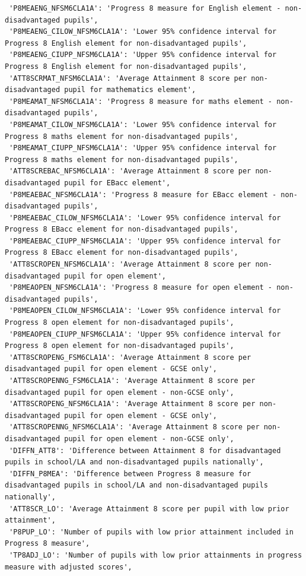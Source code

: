 \documentclass[
  letterpaper,
  DIV=11,
  numbers=noendperiod]{scrartcl}
\begin{document}
\begin{verbatim}
 'P8MEAENG_NFSM6CLA1A': 'Progress 8 measure for English element - non-disadvantaged pupils',
 'P8MEAENG_CILOW_NFSM6CLA1A': 'Lower 95% confidence interval for Progress 8 English element for non-disadvantaged pupils',
 'P8MEAENG_CIUPP_NFSM6CLA1A': 'Upper 95% confidence interval for Progress 8 English element for non-disadvantaged pupils',
 'ATT8SCRMAT_NFSM6CLA1A': 'Average Attainment 8 score per non-disadvantaged pupil for mathematics element',
 'P8MEAMAT_NFSM6CLA1A': 'Progress 8 measure for maths element - non-disadvantaged pupils',
 'P8MEAMAT_CILOW_NFSM6CLA1A': 'Lower 95% confidence interval for Progress 8 maths element for non-disadvantaged pupils',
 'P8MEAMAT_CIUPP_NFSM6CLA1A': 'Upper 95% confidence interval for Progress 8 maths element for non-disadvantaged pupils',
 'ATT8SCREBAC_NFSM6CLA1A': 'Average Attainment 8 score per non-disadvantaged pupil for EBacc element',
 'P8MEAEBAC_NFSM6CLA1A': 'Progress 8 measure for EBacc element - non-disadvantaged pupils',
 'P8MEAEBAC_CILOW_NFSM6CLA1A': 'Lower 95% confidence interval for Progress 8 EBacc element for non-disadvantaged pupils',
 'P8MEAEBAC_CIUPP_NFSM6CLA1A': 'Upper 95% confidence interval for Progress 8 EBacc element for non-disadvantaged pupils',
 'ATT8SCROPEN_NFSM6CLA1A': 'Average Attainment 8 score per non-disadvantaged pupil for open element',
 'P8MEAOPEN_NFSM6CLA1A': 'Progress 8 measure for open element - non-disadvantaged pupils',
 'P8MEAOPEN_CILOW_NFSM6CLA1A': 'Lower 95% confidence interval for Progress 8 open element for non-disadvantaged pupils',
 'P8MEAOPEN_CIUPP_NFSM6CLA1A': 'Upper 95% confidence interval for Progress 8 open element for non-disadvantaged pupils',
 'ATT8SCROPENG_FSM6CLA1A': 'Average Attainment 8 score per disadvantaged pupil for open element - GCSE only',
 'ATT8SCROPENNG_FSM6CLA1A': 'Average Attainment 8 score per disadvantaged pupil for open element - non-GCSE only',
 'ATT8SCROPENG_NFSM6CLA1A': 'Average Attainment 8 score per non-disadvantaged pupil for open element - GCSE only',
 'ATT8SCROPENNG_NFSM6CLA1A': 'Average Attainment 8 score per non-disadvantaged pupil for open element - non-GCSE only',
 'DIFFN_ATT8': 'Difference between Attainment 8 for disadvantaged pupils in school/LA and non-disadvantaged pupils nationally',
 'DIFFN_P8MEA': 'Difference between Progress 8 measure for disadvantaged pupils in school/LA and non-disadvantaged pupils nationally',
 'ATT8SCR_LO': 'Average Attainment 8 score per pupil with low prior attainment',
 'P8PUP_LO': 'Number of pupils with low prior attainment included in Progress 8 measure',
 'TP8ADJ_LO': 'Number of pupils with low prior attainments in progress measure with adjusted scores',

\end{verbatim}
\end{document}
